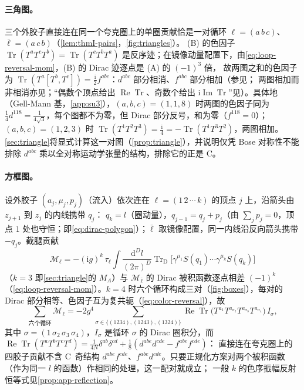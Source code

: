 \documentclass[UTF8,a4paper,11pt,fontset=fandol]{ctexart}
\theoremstyle{cplain}
\theoremstyle{cdefinition}
\theoremstyle{cremark}
\numberwithin{equation}{section}
\DeclareMathOperator{\Tr}{Tr}
\DeclareMathOperator{\Real}{Re}
\DeclareMathOperator{\Imag}{Im}
\newcommand{\TrD}{\operatorname{Tr}_{\mathrm{D}}}   %
\newcommand{\dd}{\mathrm{d}}                         %
\newcommand{\ii}{\mathrm{i}}                        %
\begin{document}
\paragraph{三角图。}三个外胶子直接连在同一个夸克圈上的单圈贡献恰是一对循环 $\ell=(a\,b\,c)$、$\bar\ell=(a\,c\,b)$（\cref{lem:thmI-pairs}，\cref{fig:triangles}）。
(B) 的色因子 $\Tr(T^aT^cT^b)=\Tr(T^cT^bT^a)$ 是反序迹；在镜像动量配置下，由\cref{eq:loop-reversal-mom}，(B) 的 Dirac 迹逐点是 (A) 的 $(-1)^3$ 倍，
故两图之和的色因子为 $\Tr(T^a[T^b,T^c])=\frac{\ii}{2}f^{abc}$：$d^{abc}$ 部分相消、$f^{abc}$ 部分相加（参见\cite{BlumAlkoferHuberWindisch2015}；
两图相加而非相消亦见\cite{DavydychevOslandSaks2001}；“偶数个顶点给出 $\Real\Tr$、奇数个给出 $\ii\Imag\Tr$”见\cite{PastonProkhvatilovFranke1999}）。具体地（Gell-Mann 基，\cref{app:su3}），$(a,b,c)=(1,1,8)$ 时两图的色因子同为
$\frac14d^{118}=\frac{1}{4\sqrt3}$，每个图都不为零，但 Dirac 部分反号，和为零（$f^{118}=0$）；$(a,b,c)=(1,2,3)$ 时 $\Tr(T^1T^2T^3)=\frac{\ii}{4}=-\Tr(T^1T^3T^2)$，两图相加。
\cref{sec:triangle}将显式计算这一对图（\cref{prop:triangle}），并说明仅凭 Bose 对称性不能排除 $d^{abc}$ 乘以全对称运动学张量的结构，排除它的正是 C。

\paragraph{方框图。}设外胶子 $(a_j,\mu_j,p_j)$（流入）依次连在 $\ell=(1\,2\,\cdots\,k)$ 的顶点 $j$ 上，沿箭头由 $z_{j+1}$ 到 $z_j$ 的内线携带 $q_j$：
$q_k=l$（圈动量），$q_{j-1}=q_j+p_j$（由 $\sum_jp_j=0$，顶点 $1$ 处也守恒；即\cref{eq:dirac-polygon}）；$\bar\ell$ 取镜像配置，同一内线沿反向箭头携带 $-q_j$。截腿贡献
\[
\mathcal M_\ell=-(\ii g)^k\,\tau_\ell\int\frac{\dd^Dl}{(2\pi)^D}\TrD\bigl[\gamma^{\mu_1}S(q_1)\cdots\gamma^{\mu_k}S(q_k)\bigr]
\]
（$k=3$ 即\cref{sec:triangle}的 $M_A$）与 $\mathcal M_{\bar\ell}$ 的 Dirac 被积函数逐点相差 $(-1)^k$（\cref{eq:loop-reversal-mom}）。$k=4$ 时六个循环构成三对（\cref{fig:boxes}），每对的 Dirac 部分相等、色因子互为复共轭（\cref{eq:color-reversal}），故
\begin{equation}\label{eq:thmI-box}
\sum_{\text{六个循环}}\mathcal M_\ell=-2g^4\!\!\sum_{\sigma\in\{(1234),(1243),(1324)\}}\!\!\Real\Tr\bigl(T^{a_1}T^{a_{\sigma_2}}T^{a_{\sigma_3}}T^{a_{\sigma_4}}\bigr)\,I_\sigma ,
\end{equation}
其中 $\sigma=(1\,\sigma_2\,\sigma_3\,\sigma_4)$，$I_\sigma$ 是循环 $\sigma$ 的 Dirac 圈积分，而 $\Real\Tr(T^aT^bT^cT^d)=\frac{1}{4N}\delta^{ab}\delta^{cd}+\frac18(d^{abe}d^{cde}-f^{abe}f^{cde})$：
直接连在夸克圈上的四胶子贡献不含 C~奇结构 $d^{abe}f^{cde}$、$f^{abe}d^{cde}$。只要正规化方案对两个被积函数（作为同一 $l$ 的函数）作相同的处理，这一配对就成立；
一般 $k$ 的色序振幅反射恒等式见\cref{prop:app-reflection}。
\end{document}
